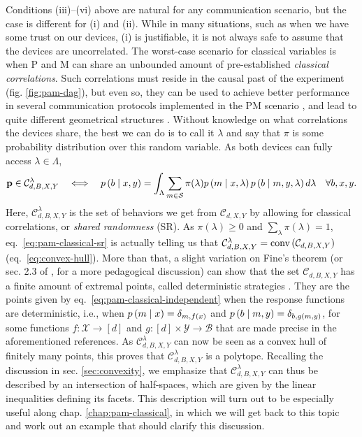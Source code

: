             Conditions (iii)--(vi) above are natural for any communication scenario, but the case is different for (i) and (ii). While in many situations, such as when we have some trust on our devices, (i) is justifiable, it is not always safe to assume that the devices are uncorrelated. The worst-case scenario for classical variables is when P and M can share an unbounded amount of pre-established \emph{classical correlations}. Such correlations must reside in the causal past of the experiment (fig. \ref{fig:pam-dag}), but even so, they can be used to achieve better performance in several communication protocols implemented in the PM scenario \cite{de_vicente_bound_2019}, and lead to quite different geometrical structures \cite{de_vicente_shared_2017,dallarno_robustness_2012}. Without knowledge on what correlations the devices share, the best we can do is to call it $\lambda$ and say that $\pi$ is some probability distribution over this random variable. As both devices can fully access $\lambda \in \Lambda$,
            \begin{equation}
                \mathbf{p} \in \mathcal{C}_{d,B,X,Y}^\lambda \quad\Longleftrightarrow \quad p \left( b \mid x,y \right) = \int_{\Lambda} \sum_{m \in \mathcal{S}} \pi(\lambda) p \left( m \mid x,\lambda \right) p \left( b \mid m,y,\lambda \right) d\lambda \quad\forall b,x,y .
                \label{eq:pam-classical-sr}
            \end{equation}
            Here, $\mathcal{C}_{d,B,X,Y}^\lambda$ is the set of behaviors we get from $\mathcal{C}_{d,X,Y}$ by allowing for classical correlations, or \emph{shared randomness} (SR). As $\pi(\lambda) \geq 0$ and $\sum_\lambda \pi(\lambda) = 1$, eq.~\eqref{eq:pam-classical-sr} is actually telling us that $\mathcal{C}_{d,B,X,Y}^\lambda = \text{conv} \left( \mathcal{C}_{d,B,X,Y} \right)$ (eq.~\eqref{eq:convex-hull}). More than that, a slight variation on Fine's theorem \cite{fine_hidden_1982} (or sec. 2.3 of \cite{scarani_bell_2019}, for a more pedagogical discussion) can show that the set $\mathcal{C}_{d,B,X,Y}$ has a finite amount of extremal points, called deterministic strategies \cite{gallego_pam_2010,de_vicente_bound_2019}. They are the points given by eq.~\eqref{eq:pam-classical-independent} when the response functions are deterministic, i.e., when $p \left( m \mid x \right) = \delta_{m,f(x)}$ and $ p \left( b \mid m,y \right) = \delta_{b,g(m,y)}$, for some functions $f : \mathcal{X} \rightarrow [d]$ and $g : [d] \times \mathcal{Y} \rightarrow \mathcal{B}$ that are made precise in the aforementioned references. As $\mathcal{C}_{d,B,X,Y}^\lambda$ can now be seen as a convex hull of finitely many points, this proves that $\mathcal{C}_{d,B,X,Y}^\lambda$ is a polytope. Recalling the discussion in sec. \ref{sec:convexity}, we emphasize that $\mathcal{C}_{d,B,X,Y}^\lambda$ can thus be described by an intersection of half-spaces, which are given by the linear inequalities defining its facets. This description will turn out to be especially useful along chap. \ref{chap:pam-classical}, in which we will get back to this topic and work out an example that should clarify this discussion.

